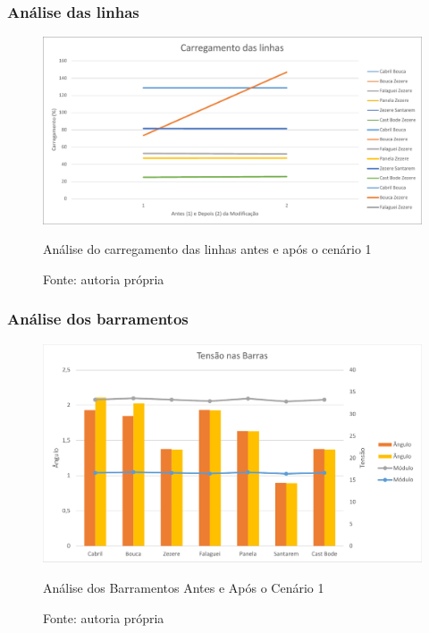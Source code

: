 \subsubsection{Análise das linhas}

\begin{figure}[H]
	\centering
	\captionsetup{width=\textwidth, font=footnotesize, textfont=bf}	
	\includegraphics[width=0.9\linewidth]{img/carregamento_linhas_caso1.pdf}
	\caption{Análise do carregamento das linhas antes e após o cenário 1}
	\vspace{-3.5mm}
	\caption*{Fonte: autoria própria}
	\label{fig:carregamento_linhas_caso1}
\end{figure}

    
\subsubsection{Análise dos barramentos}

\begin{figure}[H]
	\centering
	\captionsetup{width=\textwidth, font=footnotesize, textfont=bf}	
	\includegraphics[width=\linewidth]{img/tensoes_barras_caso1.pdf}
	\caption{Análise dos Barramentos Antes e Após o Cenário 1}
	\vspace{-3.5mm}
	\caption*{Fonte: autoria própria}
	\label{fig:tensoes_barras_caso1}
\end{figure}
    
